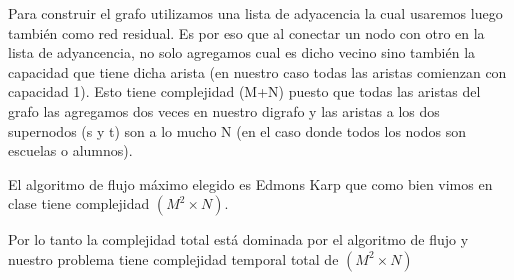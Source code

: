 Para construir el grafo utilizamos una lista de adyacencia la cual usaremos luego también como red residual. Es por eso que al conectar un nodo con otro en la lista de adyancencia, no solo agregamos cual es dicho vecino sino también la capacidad que tiene dicha arista (en nuestro caso todas las aristas comienzan con capacidad 1). Esto tiene complejidad \bigo(M+N) puesto que todas las aristas del grafo las agregamos dos veces en nuestro digrafo y las aristas a los dos supernodos (s y t) son a lo mucho N (en el caso donde todos los nodos son escuelas o alumnos). 

El algoritmo de flujo máximo elegido es Edmons Karp que como bien vimos en clase tiene complejidad \bigo$(M^2 \times N)$.

Por lo tanto la complejidad total está dominada por el algoritmo de flujo y nuestro problema tiene complejidad temporal total de \bigo$(M^2 \times N)$